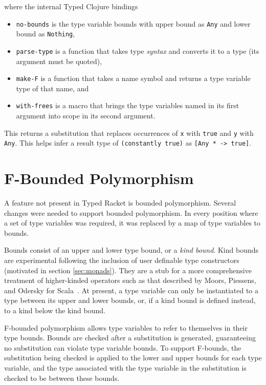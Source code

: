where the internal Typed Clojure bindings

\begin{itemize}
  \item \lstinline|no-bounds| is the type variable bounds with upper bound as \lstinline|Any|
    and lower bound as \lstinline|Nothing|,
  \item \lstinline|parse-type| is a function that takes type \emph{syntax} and converts it to a type (its argument must be quoted), 
  \item \lstinline|make-F| is a function that takes a name symbol and returns a type variable type of that name, and
  \item \lstinline|with-frees| is a macro that brings the type variables named in its first argument into scope in its second argument.
\end{itemize}

This returns a substitution that replaces occurrences of \lstinline|x| with \lstinline|true|
and \lstinline|y| with \lstinline|Any|.
This helps infer a result type of \lstinline|(constantly true)|
as \lstinline|[Any * -> true]|.

\section{F-Bounded Polymorphism}

A feature not present in Typed Racket is bounded polymorphism.
Several changes were needed to support bounded polymorphism. In every position
where a set of type variables was required, it was replaced by a map
of type variables to bounds.

Bounds consist of an upper and lower type bound, or a \emph{kind bound}.
Kind bounds are experimental following the inclusion of user definable type constructors
(motivated in section \ref{sec:monads}).
They are a stub for a more comprehensive treatment of higher-kinded operators
such as that described by Moors, Piessens, and Odersky for Scala~\cite{MPO08}.
At present, a type variable can only be instantiated to a type between
its upper and lower bounds, or, if a kind bound is defined instead, 
to a kind below the kind bound.

F-bounded polymorphism allows type variables to refer to themselves in their type bounds.
Bounds are checked after a substitution is generated, guaranteeing no substitution
can violate type variable bounds. To support F-bounds, the substitution being checked is applied to
the lower and upper bounds for each type variable, and the type associated with the type variable 
in the substitution is checked to be between these bounds.

